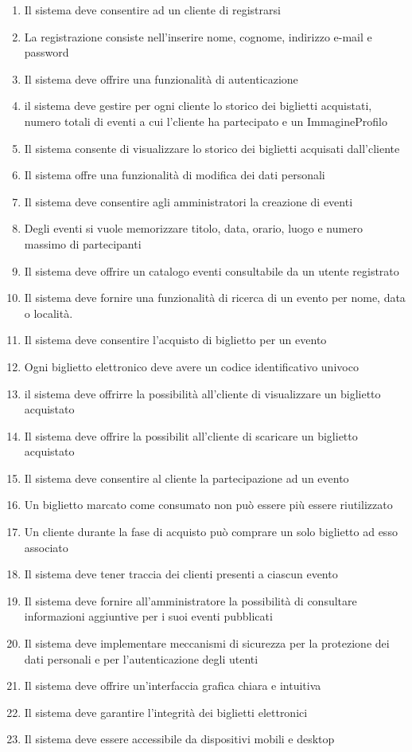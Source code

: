 \begin{enumerate}[]
    \item Il sistema deve consentire ad un cliente di registrarsi
    \item La registrazione consiste nell’inserire nome, cognome, indirizzo e-mail e password
    \item Il sistema deve offrire una funzionalità di autenticazione
    \item il sistema deve gestire per ogni cliente lo storico dei biglietti acquistati, numero totali di eventi a cui l’cliente ha partecipato e un ImmagineProfilo
    \item Il sistema consente di visualizzare lo storico dei biglietti acquisati dall'cliente
    \item Il sistema offre una funzionalità di modifica dei dati personali
    \item Il sistema deve consentire agli amministratori la creazione di eventi
    \item Degli eventi si vuole memorizzare titolo, data, orario, luogo e numero massimo di partecipanti
    \item Il sistema deve offrire un catalogo eventi consultabile da un utente registrato
    \item Il sistema deve fornire una funzionalità di ricerca di un evento per nome, data o località.
    \item Il sistema deve consentire l’acquisto di biglietto per un evento
    \item Ogni biglietto elettronico deve avere un codice identificativo univoco
    \item il sistema deve offrirre la possibilità all'cliente di visualizzare un biglietto acquistato
    \item Il sistema deve offrire la possibilit all'cliente di scaricare un biglietto acquistato
    \item Il sistema deve consentire al cliente la partecipazione ad un evento
    \item Un biglietto marcato come consumato non può essere più essere riutilizzato
    \item Un cliente durante la fase di acquisto può comprare un solo biglietto ad esso associato
    \item Il sistema deve tener traccia dei clienti presenti a ciascun evento
    \item Il sistema deve fornire all'amministratore la possibilità di consultare informazioni aggiuntive per i suoi eventi pubblicati
    \item Il sistema deve implementare meccanismi di sicurezza per la protezione dei dati personali e per l’autenticazione degli utenti
    \item Il sistema deve offrire un’interfaccia grafica chiara e intuitiva
    \item Il sistema deve garantire l’integrità dei biglietti elettronici
    \item Il sistema deve essere accessibile da dispositivi mobili e desktop
\end{enumerate}

